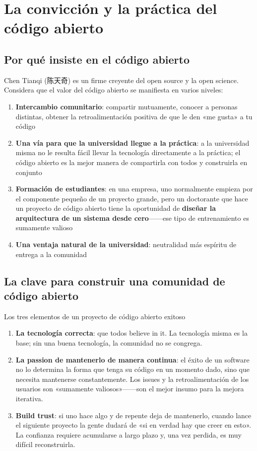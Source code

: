\section{La convicción y la práctica del código abierto}

\subsection{Por qué insiste en el código abierto}

Chen Tianqi (陈天奇) es un firme creyente del open source y la open science. Considera que el valor del código abierto se manifiesta en varios niveles:

\begin{enumerate}
    \item \textbf{Intercambio comunitario}: compartir mutuamente, conocer a personas distintas, obtener la retroalimentación positiva de que le den «me gusta» a tu código
    \item \textbf{Una vía para que la universidad llegue a la práctica}: a la universidad misma no le resulta fácil llevar la tecnología directamente a la práctica; el código abierto es la mejor manera de compartirla con todos y construirla en conjunto
    \item \textbf{Formación de estudiantes}: en una empresa, uno normalmente empieza por el componente pequeño de un proyecto grande, pero un doctorante que hace un proyecto de código abierto tiene la oportunidad de \textbf{diseñar la arquitectura de un sistema desde cero}------ese tipo de entrenamiento es sumamente valioso
    \item \textbf{Una ventaja natural de la universidad}: neutralidad más espíritu de entrega a la comunidad
\end{enumerate}

\subsection{La clave para construir una comunidad de código abierto}

\begin{importantbox}{Los tres elementos de un proyecto de código abierto exitoso}
\begin{enumerate}
    \item \textbf{La tecnología correcta}: que todos believe in it. La tecnología misma es la base; sin una buena tecnología, la comunidad no se congrega.
    \item \textbf{La passion de mantenerlo de manera continua}: el éxito de un software no lo determina la forma que tenga su código en un momento dado, sino que necesita mantenerse constantemente. Los issues y la retroalimentación de los usuarios son «sumamente valiosos»------son el mejor insumo para la mejora iterativa.
    \item \textbf{Build trust}: si uno hace algo y de repente deja de mantenerlo, cuando lance el siguiente proyecto la gente dudará de «si en verdad hay que creer en esto». La confianza requiere acumularse a largo plazo y, una vez perdida, es muy difícil reconstruirla.
\end{enumerate}
\end{importantbox}

